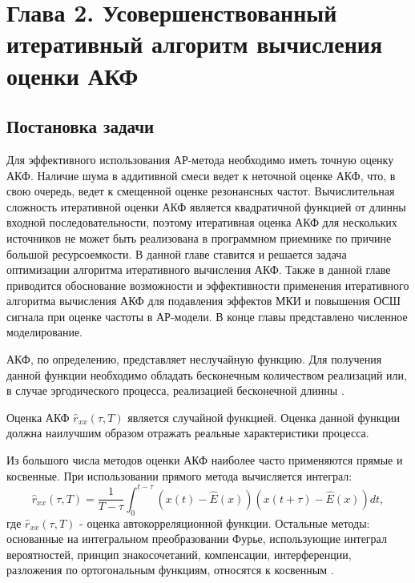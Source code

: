 \setcounter{chapter}{2}
\setcounter{section}{0}
\setcounter{equation}{0}
\setcounter{figure}{0}
\chapter*{Глава 2. Усовершенствованный итеративный алгоритм вычисления оценки АКФ}
\label{l:sec_acf}

\section{Постановка задачи}

Для эффективного использования АР-метода необходимо иметь точную оценку АКФ. Наличие шума в аддитивной смеси ведет к неточной
оценке АКФ, что, в свою очередь, ведет к смещенной оценке резонансных частот. Вычислительная сложность итеративной оценки АКФ является квадратичной
функцией от длинны входной последовательности, поэтому итеративная оценка АКФ для нескольких источников не может быть реализована в программном приемнике
по причине большой ресурсоемкости. В данной главе ставится и решается задача оптимизации алгоритма итеративного вычисления АКФ. Также в данной
главе приводится обоснование возможности и эффективности применения итеративного алгоритма вычисления АКФ для подавления эффектов МКИ и повышения ОСШ сигнала
при оценке частоты в АР-модели. В конце главы представлено численное моделирование.

АКФ, по определению, представляет неслучайную функцию.
Для получения данной функции необходимо обладать бесконечным количеством реализаций или, в случае эргодического процесса, реализацией бесконечной длинны \cite{bolshakov-book}.

Оценка АКФ ${\hat{r}_{xx}(\tau, T)}$ является случайной функцией. Оценка данной функции должна наилучшим образом отражать реальные характеристики процесса.

Из большого числа методов оценки АКФ наиболее часто применяются прямые и косвенные. При использовании прямого метода вычисляется интеграл:
\begin{equation}
	\label{eq:acf_integral_basic}
	\hat{r}_{xx}(\tau, T) = \frac{1}{T-\tau} \int_{0}^{t-\tau} (x(t) - \hat{E}(x))(x(t+\tau) - \hat{E}(x))dt,
\end{equation}
где ${\hat{r}_{xx}(\tau, T)}$ -  оценка автокорреляционной функции. Остальные методы: основанные на интегральном преобразовании Фурье, использующие интеграл вероятностей, принцип
знакосочетаний, компенсации, интерференции, разложения по ортогональным функциям, относятся к косвенным \cite{bolshakov-book}.

